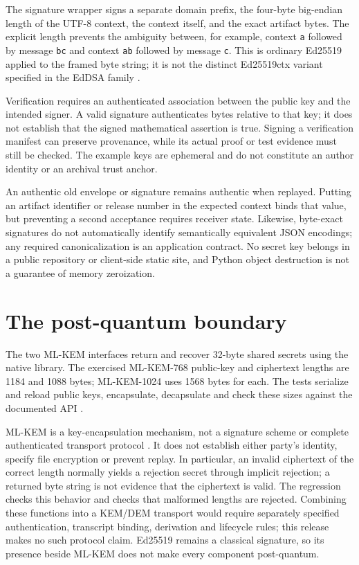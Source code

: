 The signature wrapper signs a separate domain prefix, the four-byte big-endian
length of the UTF-8 context, the context itself, and the exact artifact bytes.
The explicit length prevents the ambiguity between, for example, context
\texttt{a} followed by message \texttt{bc} and context \texttt{ab} followed by
message \texttt{c}. This is ordinary Ed25519 applied to the framed byte string;
it is not the distinct Ed25519ctx variant specified in the EdDSA family
\cite{CryptoRFC8032,CryptoAPI50Ed25519}.

Verification requires an authenticated association between the public key and
the intended signer. A valid signature authenticates bytes relative to that key;
it does not establish that the signed mathematical assertion is true. Signing
a verification manifest can preserve provenance, while its actual proof or
test evidence must still be checked. The example keys are ephemeral and do not
constitute an author identity or an archival trust anchor.

An authentic old envelope or signature remains authentic when replayed.
Putting an artifact identifier or release number in the expected context binds
that value, but preventing a second acceptance requires receiver state.
Likewise, byte-exact signatures do not automatically identify semantically
equivalent JSON encodings; any required canonicalization is an application
contract. No secret key belongs in a public repository or client-side static
site, and Python object destruction is not a guarantee of memory zeroization.

\section{The post-quantum boundary}

The two ML-KEM interfaces return and recover 32-byte shared secrets using the
native library. The exercised ML-KEM-768 public-key and ciphertext lengths are
1184 and 1088 bytes; ML-KEM-1024 uses 1568 bytes for each. The tests serialize
and reload public keys, encapsulate, decapsulate and check these sizes against
the documented API \cite{CryptoAPI50MLKEM}.

ML-KEM is a key-encapsulation mechanism, not a signature scheme or complete
authenticated transport protocol \cite{CryptoFIPS203}. It does not establish
either party's identity, specify file encryption or prevent replay. In
particular, an invalid ciphertext of the correct length normally yields a
rejection secret through implicit rejection; a returned byte string is not
evidence that the ciphertext is valid. The regression checks this behavior and
checks that malformed lengths are rejected. Combining these functions into a
KEM/DEM transport would require separately specified authentication, transcript
binding, derivation and lifecycle rules; this release makes no such protocol
claim. Ed25519 remains a classical signature, so its presence beside ML-KEM does
not make every component post-quantum.

